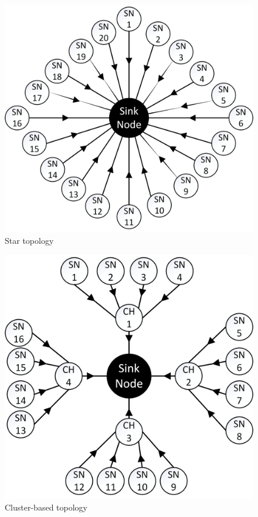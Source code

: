 \newpage
\vspace*{1.5 cm}
\begin{center}
	\begin{figure}
		\centering
		\includegraphics[width=1\linewidth]{pics/kodok}
		\caption{Star topology}
		\label{fig:kodok}
	\end{figure}
\end{center}


\newpage
\vspace*{1.5 cm}
\begin{figure}
	\centering
	\includegraphics[width=1\linewidth]{pics/kuda}
	\caption{Cluster-based topology}
	\label{fig:kuda}
\end{figure}

